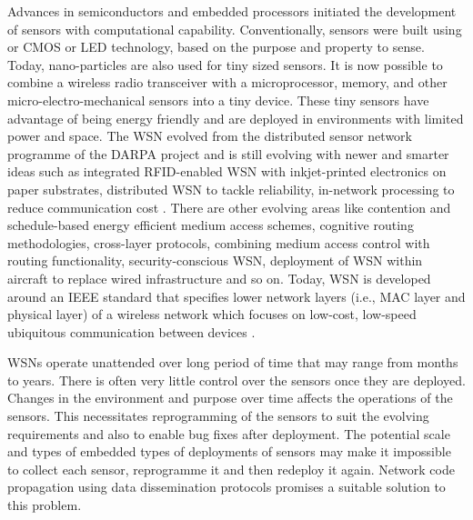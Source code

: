 \documentclass[conference,final]{IEEEtran}
\newcommand{\dme}[2]{\pdfmarkupcomment[markup=Highlight,color=yellow]{#1}{#2}}
\begin{document}
Advances in semiconductors and embedded processors initiated the development of sensors with computational capability. 
Conventionally, sensors were built using \dme{micro-electro mechanical systems (MEMS)}{example?} or CMOS or LED technology, based on the purpose and property to sense. 
Today, nano-particles are also used for tiny sized sensors.
It is now possible to combine a wireless radio transceiver with a microprocessor, memory, and other micro-electro-mechanical sensors into a tiny device.
These tiny sensors have advantage of being energy friendly and are deployed in environments with limited power and space.
The WSN evolved from the distributed sensor network programme of the DARPA project and is still evolving with newer and smarter ideas such as integrated RFID-enabled WSN with inkjet-printed electronics on paper substrates,  distributed WSN to tackle reliability, in-network processing to reduce communication cost \cite{5498900}. 
There are other evolving areas like contention and schedule-based energy efficient medium access schemes, cognitive routing methodologies, cross-layer protocols, combining medium access control with routing functionality, security-conscious WSN,  deployment of WSN within aircraft to replace  wired infrastructure and so on.
Today, WSN is developed around an IEEE standard that specifies lower network layers (i.e., MAC layer and physical layer) of a wireless network which focuses on low-cost, low-speed ubiquitous communication between devices \cite{893287}.

WSNs operate unattended over long period of time that may range from months to years.
There is often very little control over the sensors once they are deployed.
Changes in the environment and purpose over time affects the operations of the sensors. 
This necessitates reprogramming of the sensors to suit the evolving requirements and also to enable bug fixes after deployment.
The potential scale and types of embedded types of deployments of sensors may make it impossible to collect each sensor, reprogramme it and then redeploy it again. 
Network code propagation using data dissemination protocols promises a suitable solution to this problem.
\end{document}
